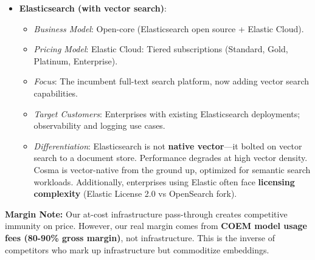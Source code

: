 \begin{itemize}
    \item \textbf{Elasticsearch (with vector search)}:
    \begin{itemize}[noitemsep]
        \item \textit{Business Model}: Open-core (Elasticsearch open source + Elastic Cloud).
        \item \textit{Pricing Model}: Elastic Cloud: Tiered subscriptions (Standard, Gold, Platinum, Enterprise).
        \item \textit{Focus}: The incumbent full-text search platform, now adding vector search capabilities.
        \item \textit{Target Customers}: Enterprises with existing Elasticsearch deployments; observability and logging use cases.
        \item \textit{Differentiation}: Elasticsearch is not \textbf{native vector}—it bolted on vector search to a document store. Performance degrades at high vector density. Cosma is vector-native from the ground up, optimized for semantic search workloads. Additionally, enterprises using Elastic often face \textbf{licensing complexity} (Elastic License 2.0 vs OpenSearch fork).
    \end{itemize}
\end{itemize}

\textbf{Margin Note:} Our at-cost infrastructure pass-through creates competitive immunity on price. However, our real margin comes from \textbf{COEM model usage fees (80-90\% gross margin)}, not infrastructure. This is the inverse of competitors who mark up infrastructure but commoditize embeddings.
